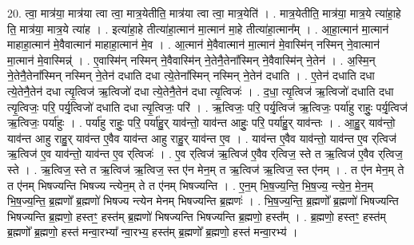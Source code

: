 \documentclass[17pt]{extarticle}
\begin{document}
20. त्वा॒ मात्र॑या॒ मात्र॑या त्वा त्वा॒ मात्र॒येतीति॒ मात्र॑या त्वा त्वा॒ मात्र॒येति॑ । . मात्र॒येतीति॒ मात्र॑या॒ मात्र॒ये त्या॑हा॒हे ति॒ मात्र॑या॒ मात्र॒ये त्या॑ह । . इत्या॑हा॒हे तीत्या॑हा॒त्मान॑ मा॒त्मान॑ मा॒हे तीत्या॑हा॒त्मान᳚म् । . आ॒हा॒त्मान॑ मा॒त्मान॑ माहाहा॒त्मान॑ मे॒वैवात्मान॑ माहाहा॒त्मान॑ मे॒व । . आ॒त्मान॑ मे॒वैवात्मान॑ मा॒त्मान॑ मे॒वास्मि॑न् नस्मिन् ने॒वात्मान॑ मा॒त्मान॑ मे॒वास्मिन्न्॑ । . ए॒वास्मि॑न् नस्मिन् ने॒वैवास्मि॑न् ने॒तेनै॒तेना᳚स्मिन् ने॒वैवास्मि॑न् ने॒तेन॑ । . अ॒स्मि॒न् ने॒तेनै॒तेना᳚स्मिन् नस्मिन् ने॒तेन॑ दधाति दधा त्ये॒तेना᳚स्मिन् नस्मिन् ने॒तेन॑ दधाति । . ए॒तेन॑ दधाति दधा त्ये॒तेनै॒तेन॑ दधा त्यृ॒त्विज॑ ऋ॒त्विजो॑ दधा त्ये॒तेनै॒तेन॑ दधा त्यृ॒त्विजः॑ । . द॒धा॒ त्यृ॒त्विज॑ ऋ॒त्विजो॑ दधाति दधा त्यृ॒त्विजः॒ परि॒ पर्यृ॒त्विजो॑ दधाति दधा त्यृ॒त्विजः॒ परि॑ । . ऋ॒त्विजः॒ परि॒ पर्यृ॒त्विज॑ ऋ॒त्विजः॒ पर्या॑हु राहुः॒ पर्यृ॒त्विज॑ ऋ॒त्विजः॒ पर्या॑हुः । . पर्या॑हु राहुः॒ परि॒ पर्या॑हु॒र् याव॑न्तो॒ याव॑न्त आहुः॒ परि॒ पर्या॑हु॒र् याव॑न्तः । . आ॒हु॒र् याव॑न्तो॒ याव॑न्त आहु राहु॒र् याव॑न्त ए॒वैव याव॑न्त आहु राहु॒र् याव॑न्त ए॒व । . याव॑न्त ए॒वैव याव॑न्तो॒ याव॑न्त ए॒व र्‌त्विज॑ ऋ॒त्विज॑ ए॒व याव॑न्तो॒ याव॑न्त ए॒व र्‌त्विजः॑ । . ए॒व र्‌त्विज॑ ऋ॒त्विज॑ ए॒वैव र्‌त्विज॒ स्ते त ऋ॒त्विज॑ ए॒वैव र्‌त्विज॒ स्ते । . ऋ॒त्विज॒ स्ते त ऋ॒त्विज॑ ऋ॒त्विज॒ स्त ए॑न मेन॒म् त ऋ॒त्विज॑ ऋ॒त्विज॒ स्त ए॑नम् । . त ए॑न मेन॒म् ते त ए॑नम् भिषज्यन्ति भिषज्य न्त्येन॒म् ते त ए॑नम् भिषज्यन्ति । . ए॒न॒म् भि॒ष॒ज्य॒न्ति॒ भि॒ष॒ज्य॒ न्त्ये॒न॒ मे॒न॒म् भि॒ष॒ज्य॒न्ति॒ ब्र॒ह्मणो᳚ ब्र॒ह्मणो॑ भिषज्य न्त्येन मेनम् भिषज्यन्ति ब्र॒ह्मणः॑ । . भि॒ष॒ज्य॒न्ति॒ ब्र॒ह्मणो᳚ ब्र॒ह्मणो॑ भिषज्यन्ति भिषज्यन्ति ब्र॒ह्मणो॒ हस्तꣳ॒॒ हस्त॑म् ब्र॒ह्मणो॑ भिषज्यन्ति भिषज्यन्ति ब्र॒ह्मणो॒ हस्त᳚म् । . ब्र॒ह्मणो॒ हस्तꣳ॒॒ हस्त॑म् ब्र॒ह्मणो᳚ ब्र॒ह्मणो॒ हस्त॑ मन्वा॒रभ्या᳚ न्वा॒रभ्य॒ हस्त॑म् ब्र॒ह्मणो᳚ ब्र॒ह्मणो॒ हस्त॑ मन्वा॒रभ्य॑ । \newline
\end{document}
